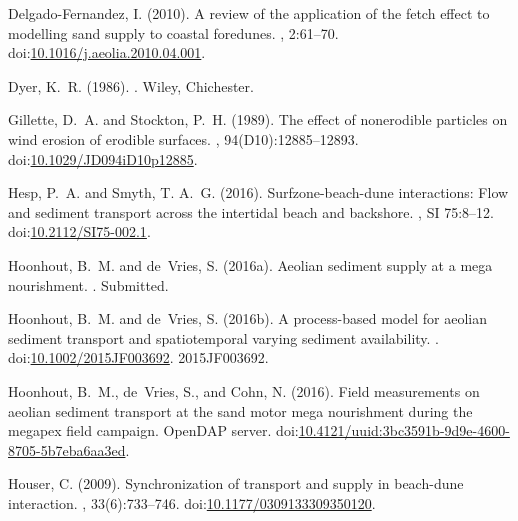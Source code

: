 \documentclass[preprint,12pt,authoryear,a4paper]{elsarticle}
\begin{document}
\begin{thebibliography}{}
Delgado-Fernandez, I. (2010).
\newblock A review of the application of the fetch effect to modelling sand
  supply to coastal foredunes.
, 2:61--70.
\newblock
  doi:\href{http://dx.doi.org/10.1016/j.aeolia.2010.04.001}{10.1016/j.aeolia.2010.04.001}.

Dyer, K.~R. (1986).
.
\newblock Wiley, Chichester.

Gillette, D.~A. and Stockton, P.~H. (1989).
\newblock The effect of nonerodible particles on wind erosion of erodible
  surfaces.
,
  94(D10):12885--12893.
\newblock
  doi:\href{http://dx.doi.org/10.1029/JD094iD10p12885}{10.1029/JD094iD10p12885}.

Hesp, P.~A. and Smyth, T. A.~G. (2016).
\newblock Surfzone-beach-dune interactions: Flow and sediment transport across
  the intertidal beach and backshore.
, SI 75:8--12.
\newblock doi:\href{http://dx.doi.org/10.2112/SI75-002.1}{10.2112/SI75-002.1}.

Hoonhout, B.~M. and de~Vries, S. (2016a).
\newblock Aeolian sediment supply at a mega nourishment.
.
\newblock Submitted.

Hoonhout, B.~M. and de~Vries, S. (2016b).
\newblock A process-based model for aeolian sediment transport and
  spatiotemporal varying sediment availability.
.
\newblock
  doi:\href{http://dx.doi.org/10.1002/2015JF003692}{10.1002/2015JF003692}.
\newblock 2015JF003692.

Hoonhout, B.~M., de~Vries, S., and Cohn, N. (2016).
\newblock Field measurements on aeolian sediment transport at the sand motor
  mega nourishment during the megapex field campaign.
\newblock OpenDAP server.
\newblock
  doi:\href{http://dx.doi.org/10.4121/uuid:3bc3591b-9d9e-4600-8705-5b7eba6aa3ed}{10.4121/uuid:3bc3591b-9d9e-4600-8705-5b7eba6aa3ed}.

Houser, C. (2009).
\newblock Synchronization of transport and supply in beach-dune interaction.
, 33(6):733--746.
\newblock
  doi:\href{http://dx.doi.org/10.1177/0309133309350120}{10.1177/0309133309350120}.


\end{thebibliography}
\end{document}
